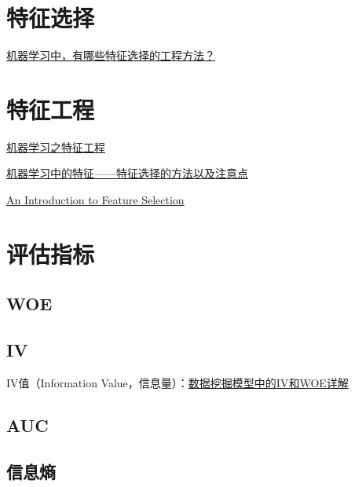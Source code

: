 \documentclass[10pt,a4paper]{ctexbook}
\begin{document}
\section{特征选择}
\href{https://www.zhihu.com/question/28641663}{机器学习中，有哪些特征选择的工程方法？}


\section{特征工程}
\href{http://blog.csdn.net/dream_angel_z/article/details/49388733}{机器学习之特征工程}

\href{http://blog.csdn.net/google19890102/article/details/40019271}{机器学习中的特征——特征选择的方法以及注意点}

\href{https://machinelearningmastery.com/an-introduction-to-feature-selection/}{An Introduction to Feature Selection}


\section{评估指标}

\subsection{WOE}

\subsection{IV}
IV值（Information Value，信息量）：\href{http://blog.csdn.net/kevin7658/article/details/50780391}{数据挖掘模型中的IV和WOE详解}

\subsection{AUC}

\subsection{信息熵}


\ifx\mlbook\undefined
    
\end{document}
